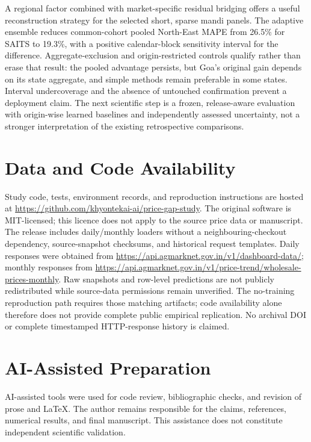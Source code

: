 \documentclass[sigconf,nonacm,balance=false]{acmart}
\begin{document}
A regional factor combined with market-specific residual bridging offers a useful reconstruction strategy for the selected short, sparse mandi panels. The adaptive ensemble reduces common-cohort pooled North-East MAPE from 26.5\% for SAITS to 19.3\%, with a positive calendar-block sensitivity interval for the difference. Aggregate-exclusion and origin-restricted controls qualify rather than erase that result: the pooled advantage persists, but Goa's original gain depends on its state aggregate, and simple methods remain preferable in some states. Interval undercoverage and the absence of untouched confirmation prevent a deployment claim. The next scientific step is a frozen, release-aware evaluation with origin-wise learned baselines and independently assessed uncertainty, not a stronger interpretation of the existing retrospective comparisons.

\section*{Data and Code Availability}
Study code, tests, environment records, and reproduction instructions are hosted at \url{https://github.com/khyontekai-ai/price-gap-study}. The original software is MIT-licensed; this licence does not apply to the source price data or manuscript. The release includes daily/monthly loaders without a neighbouring-checkout dependency, source-snapshot checksums, and historical request templates. Daily responses were obtained from \url{https://api.agmarknet.gov.in/v1/dashboard-data/}; monthly responses from \url{https://api.agmarknet.gov.in/v1/price-trend/wholesale-prices-monthly}. Raw snapshots and row-level predictions are not publicly redistributed while source-data permissions remain unverified. The no-training reproduction path requires those matching artifacts; code availability alone therefore does not provide complete public empirical replication. No archival DOI or complete timestamped HTTP-response history is claimed.

\section*{AI-Assisted Preparation}
AI-assisted tools were used for code review, bibliographic checks, and revision of prose and LaTeX. The author remains responsible for the claims, references, numerical results, and final manuscript. This assistance does not constitute independent scientific validation.
\end{document}

